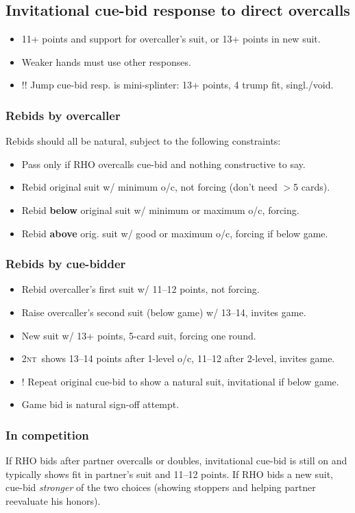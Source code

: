 \documentclass[10pt]{article}
\def\NT{\textsc{nt}}
\def\gt{$>$}
\newenvironment{mylist}[1][.5]{\begin{itemize}\itemsep=-#1\baselineskip}{\end{itemize}}
\begin{document}
\subsection{Invitational cue-bid response to direct overcalls}
\begin{mylist}[.3]
\item 11+ points and support for overcaller's suit, or 13+ points in new suit.
\item Weaker hands must use other responses.
\item[!!] Jump cue-bid resp. is mini-splinter: 13+ points, 4 trump fit, singl./void.
\end{mylist}

\subsubsection{Rebids by overcaller}
Rebids should all be natural, subject to the following constraints:
\begin{mylist}[.3]
\item Pass only if RHO overcalls cue-bid and nothing constructive to say.
\item Rebid original suit w/ minimum o/c, not forcing (don't need \gt5 cards).
\item Rebid \textbf{below} original suit w/ minimum or maximum o/c, forcing.
\item Rebid \textbf{above} orig. suit w/ good or maximum o/c, forcing if below game.
\end{mylist}
\subsubsection{Rebids by cue-bidder}
\begin{mylist}[.3]
\item Rebid overcaller's first suit w/ 11--12 points, not forcing.
\item Raise overcaller's second suit (below game) w/ 13--14, invites game.
\item New suit w/ 13+ points, 5-card suit, forcing one round.
\item 2\NT\ shows 13--14 points after 1-level o/c, 11--12 after 2-level, invites game.
\item[!] Repeat original cue-bid to show a natural suit, invitational if below game.
\item Game bid is natural sign-off attempt.
\end{mylist}

\subsubsection{In competition}
If RHO bids after partner overcalls or doubles, invitational cue-bid is still 
on and typically shows fit in partner's suit and 11--12 points.  If RHO
bids a new suit, cue-bid \emph{stronger} of the two choices (showing stoppers
and helping partner reevaluate his honors).
\end{document}
